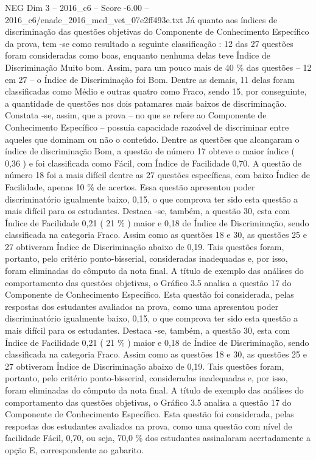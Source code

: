 \begin{textsample}{NEG Dim 3 – 2016\_c6 – Score -6.00 – 2016\_c6/enade\_2016\_med\_vet\_07e2ff493e.txt}
Já quanto aos índices de discriminação das questões objetivas do Componente de Conhecimento Específico da prova, tem -se como resultado a seguinte classificação : 12 das 27 questões foram consideradas como boas, enquanto nenhuma delas teve Índice de Discriminação Muito bom.
Assim, para um pouco mais de 40 \% das questões – 12 em 27 – o Índice de Discriminação foi Bom.
Dentre as demais, 11 delas foram classificadas como Médio e outras quatro como Fraco, sendo 15, por conseguinte, a quantidade de questões nos dois patamares mais baixos de discriminação.
Constata -se, assim, que a prova – no que se refere ao Componente de Conhecimento Específico – possuía capacidade razoável de discriminar entre aqueles que dominam ou não o conteúdo.
Dentre as questões que alcançaram o índice de discriminação Bom, a questão de número 17 obteve o maior índice ( 0,36 ) e foi classificada como Fácil, com Índice de Facilidade 0,70.
A questão de número 18 foi a mais difícil dentre as 27 questões específicas, com baixo Índice de Facilidade, apenas 10 \% de acertos.
Essa questão apresentou poder discriminatório igualmente baixo, 0,15, o que comprova ter sido esta questão a mais difícil para os estudantes.
Destaca -se, também, a questão 30, esta com Índice de Facilidade 0,21 ( 21 \% ) maior e 0,18 de Índice de Discriminação, sendo classificada na categoria Fraco.
Assim como as questões 18 e 30, as questões 25 e 27 obtiveram Índice de Discriminação abaixo de 0,19.
Tais questões foram, portanto, pelo critério ponto-bisserial, consideradas inadequadas e, por isso, foram eliminadas do cômputo da nota final.
A título de exemplo das análises do comportamento das questões objetivas, o Gráfico 3.5 analisa a questão 17 do Componente de Conhecimento Específico.
Esta questão foi considerada, pelas respostas dos estudantes avaliados na prova, como uma apresentou poder discriminatório igualmente baixo, 0,15, o que comprova ter sido esta questão a mais difícil para os estudantes.
Destaca -se, também, a questão 30, esta com Índice de Facilidade 0,21 ( 21 \% ) maior e 0,18 de Índice de Discriminação, sendo classificada na categoria Fraco.
Assim como as questões 18 e 30, as questões 25 e 27 obtiveram Índice de Discriminação abaixo de 0,19.
Tais questões foram, portanto, pelo critério ponto-bisserial, consideradas inadequadas e, por isso, foram eliminadas do cômputo da nota final.
A título de exemplo das análises do comportamento das questões objetivas, o Gráfico 3.5 analisa a questão 17 do Componente de Conhecimento Específico.
Esta questão foi considerada, pelas respostas dos estudantes avaliados na prova, como uma questão com nível de facilidade Fácil, 0,70, ou seja, 70,0 \% dos estudantes assinalaram acertadamente a opção E, correspondente ao gabarito.

\end{textsample}
